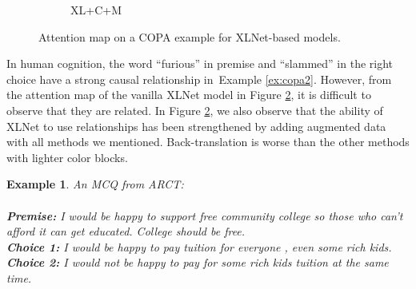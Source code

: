 \documentclass[letterpaper]{article} %
\newtheorem{example}{Example}
\newcommand{\figref}[1]{Figure \ref{#1}}
\newcommand{\exref}[1]{Example \ref{#1}}
\newcommand{\KZ}[1]{\textcolor{blue}{Kenny: #1}}
\newcommand{\crosssymbol}{{\color{red} \XSolidBrush} }
\newcommand{\checksymbol}{{\color{green} \Checkmark} }
\begin{document}
\begin{figure}[th!]
\begin{subfigure}[b]{0.20\textwidth}
\caption{XL+C+M}
\label{fig:copa2_cm}
\end{subfigure}
\caption{Attention map on a COPA example for XLNet-based models.}
\label{fig:copa2_bert}
\end{figure}

In human cognition, the word ``furious'' in premise and ``slammed'' in the right choice 
have a strong causal relationship in~\exref{ex:copa2}. 
However, from the attention map of the vanilla XLNet model in \figref{fig:copa2_bert}, 
it is difficult to observe that they are related. 
In \figref{fig:copa2_bert}, we also observe that 
the ability of XLNet to use relationships has been strengthened by adding augmented data with all 
methods we mentioned. Back-translation is worse than the other methods with lighter color blocks.

\begin{example}\label{ex:arct1}
An MCQ from ARCT:\\ \\
\noindent
\textbf{Premise:} I would be happy to support free community college so those who can't afford it can get educated. College should be free.\\
\textbf{Choice 1:} I would be happy to pay tuition for everyone , even some rich kids.  \checksymbol \\
\textbf{Choice 2:} I would not be happy to pay for some rich kids tuition at the same time. \crosssymbol
\end{example}
\end{document}
